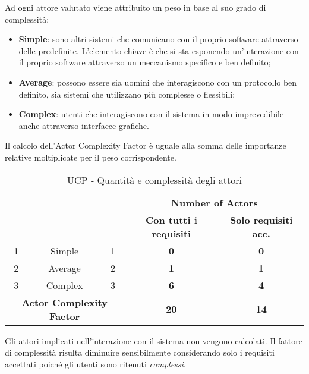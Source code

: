 Ad ogni attore valutato viene attribuito un peso in base al suo grado di complessità:

\begin{itemize}
	\item \textbf{Simple}: sono altri sistemi che comunicano con il proprio software attraverso delle  predefinite. L'elemento chiave è che si sta esponendo un'interazione con il proprio software attraverso un meccanismo specifico e ben definito;
	\item \textbf{Average}: possono essere sia uomini che interagiscono con un protocollo ben definito, sia sistemi che utilizzano  più complesse o flessibili;
	\item \textbf{Complex}: utenti che interagiscono con il sistema in modo imprevedibile anche attraverso interfacce grafiche.
\end{itemize}

Il calcolo dell'Actor Complexity Factor è uguale alla somma delle importanze relative moltiplicate per il peso corrispondente.

\begin{table}[H]
\begin{adjustwidth}{-4cm}{-4cm}
	\begin{center}
		\begin{tabular}{|c|c|c|c|c|}
			\hline
			\multicolumn{ 2}{|c|}{\raisebox{-1\height}{\textbf{Attori}}} & \multicolumn{ 1}{c|}{\raisebox{-1\height}{\textbf{Peso}}} & \multicolumn{ 2}{c|}{\textbf{Number of Actors}} \\ \cline{ 4- 5}
			\multicolumn{ 2}{|c|}{\textbf{}} & \multicolumn{ 1}{c|}{} & \textbf{Con tutti i requisiti} & \textbf{Solo requisiti acc.} \\ \hline
			1 & Simple & 1 & \textbf{0} & \textbf{0} \\ \hline
			2 & Average & 2 & \textbf{1} & \textbf{1} \\ \hline
			3 & Complex & 3 & \textbf{6} & \textbf{4} \\ \hline
			\multicolumn{ 3}{|c|}{\textbf{Actor Complexity Factor}} & \textbf{20} & \textbf{14} \\ \hline
		\end{tabular}
	\end{center}
\caption{UCP - Quantità e complessità degli attori}
\end{adjustwidth}
\end{table}

Gli attori implicati nell'interazione con il sistema  non vengono calcolati. Il fattore di complessità risulta diminuire sensibilmente considerando solo i requisiti accettati poiché gli utenti  sono ritenuti \emph{complessi}.


